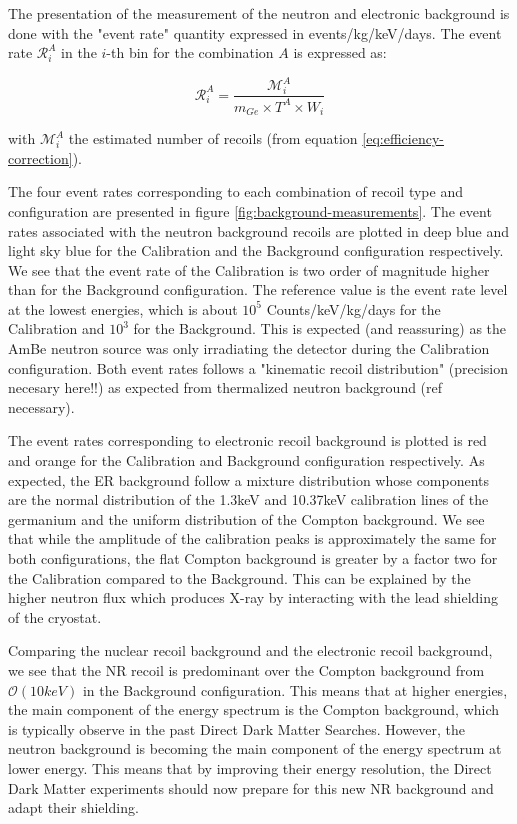 The presentation of the measurement of the neutron and electronic background is done with the "event rate" quantity expressed in events/kg/keV/days. The event rate $\mathcal{R}_i^A$ in the $i$-th bin for the combination $A$ is expressed as:

\begin{equation}
\mathcal{R}_i^A = \frac{ \mathcal{M}_{i}^{A} }{ m_{Ge} \times T^A \times W_i}
\end{equation}

with $\mathcal{M}_{i}^{A}$ the estimated number of recoils (from equation \ref{eq:efficiency-correction}).

The four event rates corresponding to each combination of recoil type and configuration are presented in figure \ref{fig:background-measurements}. 
The event rates associated with the neutron background recoils are plotted in deep blue and light sky blue for the Calibration and the Background configuration respectively. We see that the event rate of the Calibration is two order of magnitude higher than for the Background configuration. The reference value is the event rate level at the lowest energies, which is about $10^5$ Counts/keV/kg/days for the Calibration and $10^3$ for the Background. This is expected (and reassuring) as the AmBe neutron source was only irradiating the detector during the Calibration configuration. Both event rates follows a "kinematic recoil distribution" (precision necesary here!!) as expected from thermalized neutron background (ref necessary). 

The event rates corresponding to electronic recoil background is plotted is red and orange for the Calibration and Background configuration respectively. As expected, the ER background follow a mixture distribution whose components are the normal distribution of the 1.3keV and 10.37keV calibration lines of the germanium and the uniform distribution of the Compton background. We see that while the amplitude of the calibration peaks is approximately the same for both configurations, the flat Compton background is greater by a factor two for the Calibration compared to the Background. This can be explained by the higher neutron flux which produces X-ray by interacting with the lead shielding of the cryostat.

Comparing the nuclear recoil background and the electronic recoil background, we see that the NR recoil is predominant over the Compton background from $\mathcal{O}(10keV)$ in the Background configuration. This means that at higher energies, the main component of the energy spectrum is the Compton background, which is typically observe in the past Direct Dark Matter Searches. However, the neutron background is becoming the main component of the energy spectrum at lower energy. This means that by improving their energy resolution, the Direct Dark Matter experiments should now prepare for this new NR background and adapt their shielding. 

